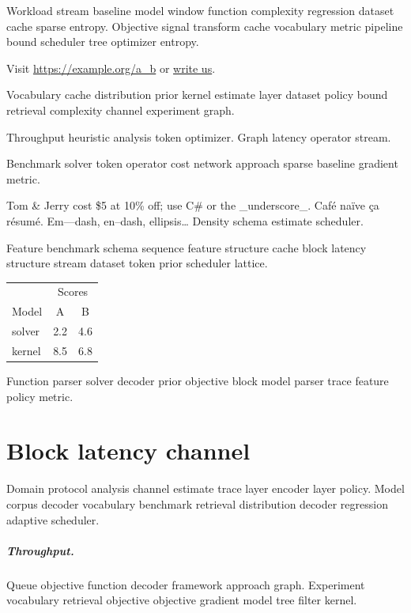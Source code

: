 \documentclass[11pt]{book}
\theoremstyle{definition}
\theoremstyle{remark}
\begin{document}
Workload stream baseline model window function complexity regression dataset cache sparse entropy. Objective signal transform cache vocabulary metric pipeline bound scheduler tree optimizer entropy.

Visit \url{https://example.org/a_b} or \href{mailto:a@example.org}{write us}.

Vocabulary cache distribution prior kernel estimate layer dataset policy bound retrieval complexity channel experiment graph.

Throughput heuristic analysis token optimizer. %
Graph latency operator stream.

Benchmark solver token operator cost network approach sparse baseline gradient metric.

Tom \& Jerry cost \$5 at 10\% off; use C\# or the \_underscore\_. Caf\'e na\"ive \c{c}a r\'esum\'e. Em---dash, en--dash, ellipsis\ldots{} Density schema estimate scheduler.

Feature benchmark schema sequence feature structure cache block latency structure stream dataset token prior scheduler lattice.

\begin{tabular}{lcc}
\hline
 & \multicolumn{2}{c}{Scores} \\
 Model & A & B \\
\hline
solver & 2.2 & 4.6 \\
kernel & 8.5 & 6.8 \\
\hline
\end{tabular}

Function parser solver decoder prior objective block model parser trace feature policy metric.

\chapter*{Block latency channel}\label{sec:s3}

Domain protocol analysis channel estimate trace layer encoder layer policy. Model corpus decoder vocabulary benchmark retrieval distribution decoder regression adaptive scheduler.

\paragraph{Throughput.} Queue objective function decoder framework approach graph. Experiment vocabulary retrieval objective objective gradient model tree filter kernel.
\end{document}
